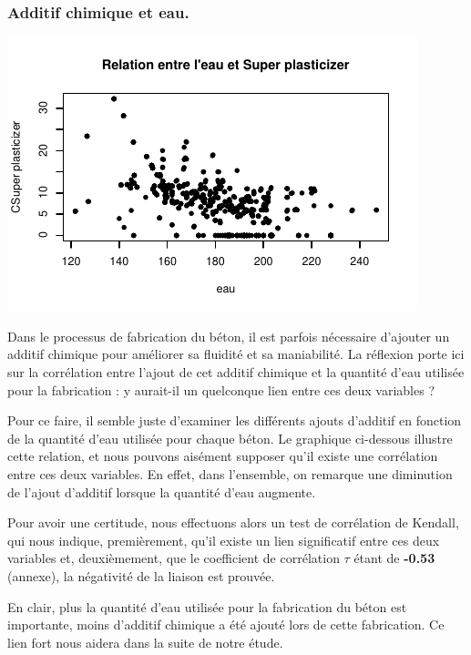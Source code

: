 \documentclass[
  12pt,
]{article}
\begin{document}
\subsubsection{Additif chimique et eau.}\label{additif-chimique-et-eau.}

\begin{center}\includegraphics{rmd_final_files/figure-latex/unnamed-chunk-11-1} \end{center}

Dans le processus de fabrication du béton, il est parfois nécessaire
d'ajouter un additif chimique pour améliorer sa fluidité et sa
maniabilité. La réflexion porte ici sur la corrélation entre l'ajout de
cet additif chimique et la quantité d'eau utilisée pour la fabrication :
y aurait-il un quelconque lien entre ces deux variables ?

Pour ce faire, il semble juste d'examiner les différents ajouts
d'additif en fonction de la quantité d'eau utilisée pour chaque béton.
Le graphique ci-dessous illustre cette relation, et nous pouvons
aisément supposer qu'il existe une corrélation entre ces deux variables.
En effet, dans l'ensemble, on remarque une diminution de l'ajout
d'additif lorsque la quantité d'eau augmente.

Pour avoir une certitude, nous effectuons alors un test de corrélation
de Kendall, qui nous indique, premièrement, qu'il existe un lien
significatif entre ces deux variables et, deuxièmement, que le
coefficient de corrélation \(\tau\) étant de \textbf{-0.53} (annexe), la
négativité de la liaison est prouvée.

En clair, plus la quantité d'eau utilisée pour la fabrication du béton
est importante, moins d'additif chimique a été ajouté lors de cette
fabrication. Ce lien fort nous aidera dans la suite de notre étude.
\end{document}

